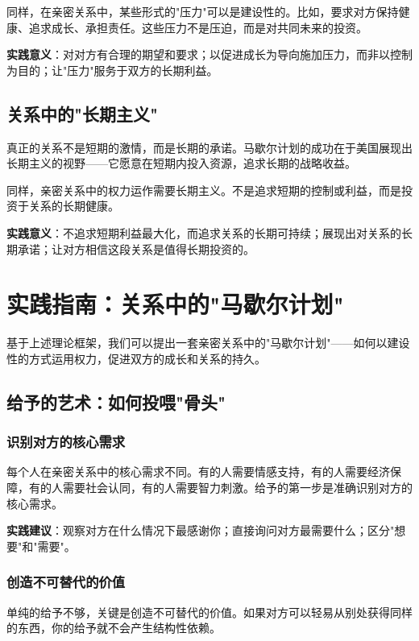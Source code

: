 \documentclass[12pt,a4paper]{article}
\begin{document}
同样，在亲密关系中，某些形式的"压力"可以是建设性的。比如，要求对方保持健康、追求成长、承担责任。这些压力不是压迫，而是对共同未来的投资。

\textbf{实践意义}：对对方有合理的期望和要求；以促进成长为导向施加压力，而非以控制为目的；让"压力"服务于双方的长期利益。

\subsection{关系中的"长期主义"}

真正的关系不是短期的激情，而是长期的承诺。马歇尔计划的成功在于美国展现出长期主义的视野——它愿意在短期内投入资源，追求长期的战略收益。

同样，亲密关系中的权力运作需要长期主义。不是追求短期的控制或利益，而是投资于关系的长期健康。

\textbf{实践意义}：不追求短期利益最大化，而追求关系的长期可持续；展现出对关系的长期承诺；让对方相信这段关系是值得长期投资的。

\section{实践指南：关系中的"马歇尔计划"}

基于上述理论框架，我们可以提出一套亲密关系中的"马歇尔计划"——如何以建设性的方式运用权力，促进双方的成长和关系的持久。

\subsection{给予的艺术：如何投喂"骨头"}

\subsubsection{识别对方的核心需求}

每个人在亲密关系中的核心需求不同。有的人需要情感支持，有的人需要经济保障，有的人需要社会认同，有的人需要智力刺激。给予的第一步是准确识别对方的核心需求。

\textbf{实践建议}：观察对方在什么情况下最感谢你；直接询问对方最需要什么；区分"想要"和"需要"。

\subsubsection{创造不可替代的价值}

单纯的给予不够，关键是创造不可替代的价值。如果对方可以轻易从别处获得同样的东西，你的给予就不会产生结构性依赖。
\end{document}
